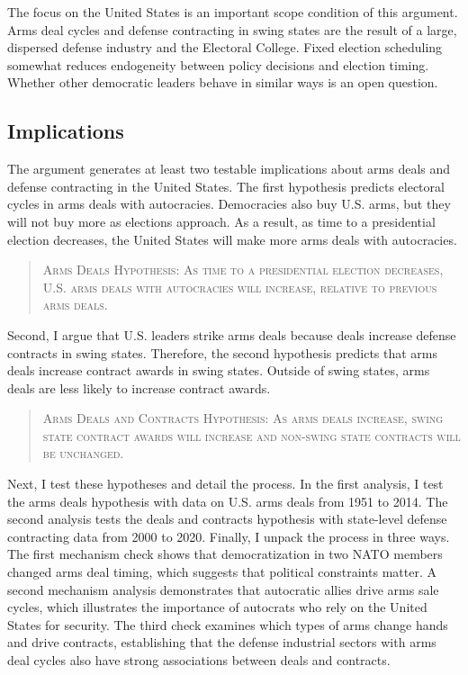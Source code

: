 \documentclass[12pt]{article}
\begin{document}
The focus on the United States is an important scope condition of this argument.
Arms deal cycles and defense contracting in swing states are the result of a large, dispersed defense industry and the Electoral College. 
Fixed election scheduling somewhat reduces endogeneity between policy decisions and election timing. 
Whether other democratic leaders behave in similar ways is an open question. 



\subsection{Implications}


The argument generates at least two testable implications about arms deals and defense contracting in the United States. 
The first hypothesis predicts electoral cycles in arms deals with autocracies.
Democracies also buy U.S. arms, but they will not buy more as elections approach. 
As a result, as time to a presidential election decreases, the United States will make more arms deals with autocracies. 


\begin{quote}
\textsc{Arms Deals Hypothesis: As time to a presidential election decreases, U.S. arms deals with autocracies will increase, relative to previous arms deals.}
\end{quote}


Second, I argue that U.S. leaders strike arms deals because deals increase defense contracts in swing states.
Therefore, the second hypothesis predicts that arms deals increase contract awards in swing states.
Outside of swing states, arms deals are less likely to increase contract awards. 


\begin{quote}
\textsc{Arms Deals and Contracts Hypothesis: As arms deals increase, swing state contract awards will increase and non-swing state contracts will be unchanged.}
\end{quote}


Next, I test these hypotheses and detail the process. 
In the first analysis, I test the arms deals hypothesis with data on U.S. arms deals from 1951 to 2014.  
The second analysis tests the deals and contracts hypothesis with state-level defense contracting data from 2000 to 2020. 
Finally, I unpack the process in three ways.
The first mechanism check shows that democratization in two NATO members changed arms deal timing, which suggests that political constraints matter. 
A second mechanism analysis demonstrates that autocratic allies drive arms sale cycles, which illustrates the importance of autocrats who rely on the United States for security. 
The third check examines which types of arms change hands and drive contracts, establishing that the defense industrial sectors with arms deal cycles also have strong associations between deals and contracts. 
\end{document}

